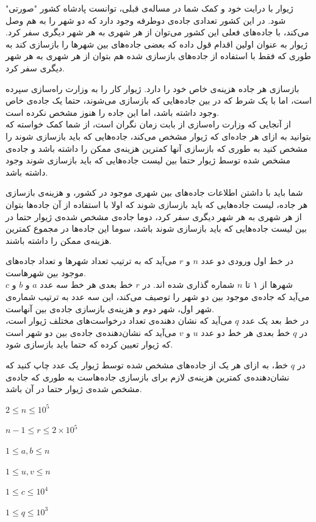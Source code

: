 \documentclass[11.5pt,a4paper,oneside]{article}
\begin{document}
\begin{problem}
ژیوار با درایت خود و کمک شما در مساله‌ی قبلی، توانست پادشاه کشور "صورتی" شود. در این کشور تعدادی جاده‌ی دوطرفه‌ وجود دارد که دو شهر را به هم وصل می‌کند، با جاده‌های فعلی این کشور می‌توان از هر شهری به هر شهر دیگری سفر کرد.
ژیوار به عنوان اولین اقدام قول داده که بعضی جاده‌های بین شهر‌ها را بازسازی کند به طوری که فقط با استفاده از جاده‌های بازسازی شده هم بتوان از هر شهری به هر شهر دیگری سفر کرد.

بازسازی هر جاده هزینه‌ی خاص خود را دارد. ژیوار کار را به وزارت راه‌سازی سپرده است، اما با یک شرط که در بین جاده‌هایی که باز‌سازی می‌شوند، حتما یک جاده‌ی خاص وجود داشته باشد، اما این جاده‌ را هنوز مشخص نکرده است.
\\
از آنجایی که وزارت راه‌سازی از بابت زمان نگران است، از شما کمک خواسته که بتوانید به ازای هر جاده‌ای که ژیوار مشخص می‌کند، جاده‌هایی که باید بازسازی شوند را مشخص کنید به طوری که بازسازی آنها کمترین هزینه‌ی ممکن را داشته باشد و جاده‌ی مشخص شده توسط ژیوار حتما بین لیست جاده‌هایی که باید بازسازی شوند وجود داشته باشد.

شما باید با داشتن اطلاعات جاده‌های بین شهری موجود در کشور، و هزینه‌ی بازسازی هر جاده، لیست جاده‌هایی که باید بازسازی شوند که اولا با استفاده از آن جاده‌ها بتوان از هر شهری به هر شهر دیگری سفر کرد، دوما جاده‌ی مشخص شده‌ی ژیوار حتما در بین لیست جاده‌هایی که باید بازسازی شوند باشد، سوما این جاده‌ها در مجموع کمترین هزینه‌ی ممکن را داشته باشند.

در خط اول ورودی دو عدد $n$ و $r$ می‌آید که به ترتیب تعداد شهر‌ها و تعداد جاده‌های موجود بین شهر‌هاست.\\
شهرها از ۱ تا $n$ شماره گذاری شده اند. در $r$ خط بعدی هر خط سه عدد $a$ و $b$ و $c$ می‌آید که جاده‌ی موجود بین دو شهر را توصیف می‌کند، این سه عدد به ترتیب شماره‌ی شهر اول، شهر دوم و هزینه‌ی بازسازی جاده‌ی بین آنهاست.\\
در خط بعد یک عدد $q$ می‌آید که نشان دهنده‌ی تعداد درخواست‌های مختلف ژیوار است، در $q$ خط بعدی هر خط دو عدد $u$ و $v$ می‌آید که نشان‌دهنده‌ی جاده‌ی بین دو شهر است که ژیوار تعیین کرده که حتما باید بازسازی شود.

\outputDescription
در $q$ خط، به ازای هر یک از جاده‌های مشخص شده توسط ژیوار یک عدد چاپ کنید که نشان‌دهنده‌ی کمترین هزینه‌ی لازم برای بازسازی جاده‌هاست به طوری که جاده‌ی مشخص شده‌ی ژیوار حتما در آن باشد.

\constraints
\begin{shortitems}
\item $2 \le n \le 10^5$
\item $n-1 \le r \le 2 \times 10^5$
\item $1 \le a, b \le n$
\item $1 \le u, v \le n$
\item $1 \le c \le 10^4$
\item $1 \le q \le 10^3$
\end{shortitems}


\end{problem}
\end{document}

